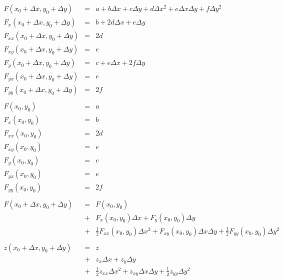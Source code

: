 \documentclass[oneside,12pt]{article}
\begin{document}
{{$$\begin{array}{rcl}
  F(x_0+Δx,y_0+Δy)   &=& a + bΔx + cΔy + dΔx^2 + eΔxΔy + fΔy^2 \\
  F_x(x_0+Δx,y_0+Δy) &=& b + 2dΔx + eΔy \\
  F_{xx}(x_0+Δx,y_0+Δy) &=& 2d \\
  F_{xy}(x_0+Δx,y_0+Δy) &=& e \\
  F_y(x_0+Δx,y_0+Δy) &=& c + eΔx + 2fΔy \\
  F_{yx}(x_0+Δx,y_0+Δy) &=& e \\
  F_{yy}(x_0+Δx,y_0+Δy) &=& 2f \\
  \\
  F(x_0,y_0)   &=& a \\
  F_x(x_0,y_0) &=& b \\
  F_{xx}(x_0,y_0) &=& 2d \\
  F_{xy}(x_0,y_0) &=& e \\
  F_y(x_0,y_0) &=& c \\
  F_{yx}(x_0,y_0) &=& e \\
  F_{yy}(x_0,y_0) &=& 2f \\
  \\
  F(x_0+Δx,y_0+Δy) &=& F(x_0,y_0) \\
         &+& F_x(x_0,y_0)Δx + F_y(x_0,y_0)Δy \\
         &+& \frac12 F_{xx}(x_0,y_0)Δx^2 + F_{xy}(x_0,y_0)ΔxΔy + \frac12 F_{yy}(x_0,y_0)Δy^2 \\
  \\
  z(x_0+Δx,y_0+Δy) &=& z \\
         &+& z_x Δx + z_y Δy \\
         &+& \frac12 z_{xx}Δx^2 + z_{xy}ΔxΔy + \frac12 z_{yy}Δy^2 \\
  \end{array}
$$


}}


\newpage


\end{document}
